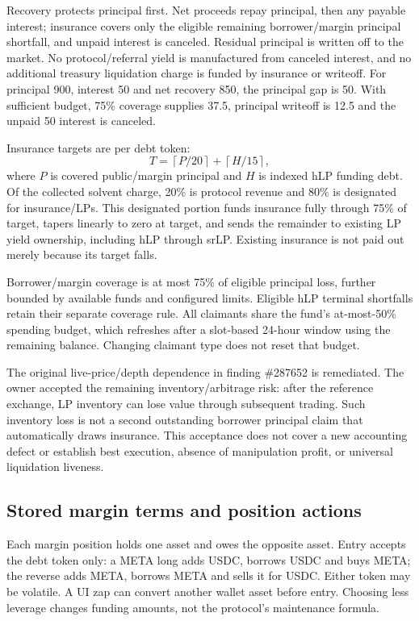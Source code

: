 Recovery protects principal first. Net proceeds repay principal, then any payable interest; insurance covers only the eligible remaining borrower/margin principal shortfall, and unpaid interest is canceled. Residual principal is written off to the market. No protocol/referral yield is manufactured from canceled interest, and no additional treasury liquidation charge is funded by insurance or writeoff. For principal 900, interest 50 and net recovery 850, the principal gap is 50. With sufficient budget, 75\% coverage supplies 37.5, principal writeoff is 12.5 and the unpaid 50 interest is canceled.

Insurance targets are per debt token:
\[
T=\left\lceil P/20\right\rceil+\left\lceil H/15\right\rceil,
\]
where $P$ is covered public/margin principal and $H$ is indexed hLP funding debt. Of the collected solvent charge, 20\% is protocol revenue and 80\% is designated for insurance/LPs. This designated portion funds insurance fully through 75\% of target, tapers linearly to zero at target, and sends the remainder to existing LP yield ownership, including hLP through srLP. Existing insurance is not paid out merely because its target falls.

Borrower/margin coverage is at most 75\% of eligible principal loss, further bounded by available funds and configured limits. Eligible hLP terminal shortfalls retain their separate coverage rule. All claimants share the fund's at-most-50\% spending budget, which refreshes after a slot-based 24-hour window using the remaining balance. Changing claimant type does not reset that budget.

The original live-price/depth dependence in finding \#287652 is remediated. The owner accepted the remaining inventory/arbitrage risk: after the reference exchange, LP inventory can lose value through subsequent trading. Such inventory loss is not a second outstanding borrower principal claim that automatically draws insurance. This acceptance does not cover a new accounting defect or establish best execution, absence of manipulation profit, or universal liquidation liveness.

\subsection{Stored margin terms and position actions}
\label{sec:margin}

Each margin position holds one asset and owes the opposite asset. Entry accepts the debt token only: a META long adds USDC, borrows USDC and buys META; the reverse adds META, borrows META and sells it for USDC. Either token may be volatile. A UI zap can convert another wallet asset before entry. Choosing less leverage changes funding amounts, not the protocol's maintenance formula.

